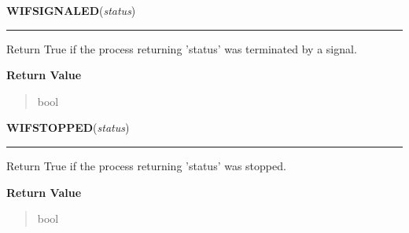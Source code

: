     \vspace{0.5ex}

\hspace{.8\funcindent}\begin{boxedminipage}{\funcwidth}

    \raggedright \textbf{WIFSIGNALED}(\textit{status})

    \vspace{-1.5ex}

    \rule{\textwidth}{0.5\fboxrule}
\setlength{\parskip}{2ex}
    Return True if the process returning 'status' was terminated by a 
    signal.

\setlength{\parskip}{1ex}
      \textbf{Return Value}
    \vspace{-1ex}

      \begin{quote}
      bool

      \end{quote}

    \end{boxedminipage}

    \label{os:WIFSTOPPED}

    \vspace{0.5ex}

\hspace{.8\funcindent}\begin{boxedminipage}{\funcwidth}

    \raggedright \textbf{WIFSTOPPED}(\textit{status})

    \vspace{-1.5ex}

    \rule{\textwidth}{0.5\fboxrule}
\setlength{\parskip}{2ex}
    Return True if the process returning 'status' was stopped.

\setlength{\parskip}{1ex}
      \textbf{Return Value}
    \vspace{-1ex}

      \begin{quote}
      bool

      \end{quote}

    \end{boxedminipage}

    \label{os:WSTOPSIG}

    \vspace{0.5ex}

